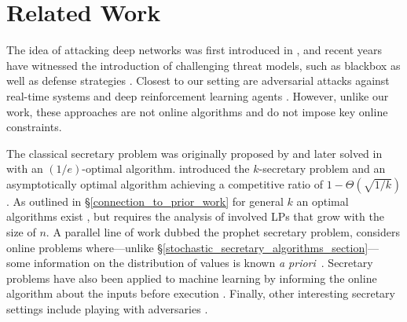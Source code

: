\section{Related Work}
 The idea of attacking deep networks was first introduced in \citep{szegedy2013intriguing,goodfellow2014explaining}, and recent years have witnessed the introduction of challenging threat models, such as blackbox \cite{chen2017zoo,ilyas2018black, jiang2019black,bose2020adversarial,chakraborty2018adversarial} as well as defense strategies \cite{madry2017towards,tramer2017ensemble,Ding2020MMA}.
Closest to our setting are adversarial attacks against real-time systems \cite{gong2019real, gong2019remasc} and deep reinforcement learning agents \cite{lin2017tactics,sun2020stealthy}. However, unlike our work, these approaches are not online algorithms and do not impose key online constraints.

 The classical secretary problem was originally proposed by \cite{gardner1960mathematical} and later solved in \cite{dynkin1963optimum} with an $(1/e)$-optimal algorithm. \citet{kleinberg2005multiple} introduced the $k$-secretary problem and an asymptotically optimal algorithm achieving a competitive ratio of $1 - \Theta(\sqrt{1/k})$. 
As outlined in \S\ref{connection_to_prior_work} for general $k$ an optimal algorithms exist \cite{chan2014revealing}, but requires the analysis of involved LPs that grow with the size of $n$. A parallel line of work dubbed the prophet secretary problem, considers online problems where---unlike \S\ref{stochastic_secretary_algorithms_section}---some information on the distribution of values is known \textit{a priori}~\cite{azar2014prophet, azar2018prophet, esfandiari2017prophet}. Secretary problems have also been applied to machine learning by informing the online algorithm about the inputs before execution \cite{antoniadis2020secretary,dutting2020secretaries}. 
Finally, other interesting secretary settings include playing with adversaries \cite{bradac2019robust, kaplan2020competitive}.




